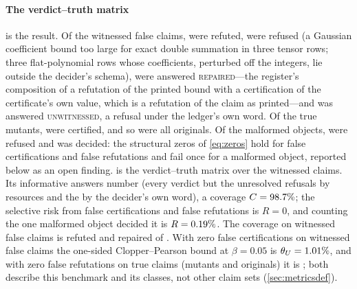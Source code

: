 \documentclass[preprint,11pt,a4paper]{elsarticle}
\theoremstyle{definition}
\begin{document}
\paragraph{The verdict--truth matrix}
 is the result. Of the \MtSaFalseWitnessed{} witnessed false claims, \MtSaFalseRefuted{} were refuted, \MtSaRefusalsOnFalse{} were refused (a Gaussian coefficient bound too large for exact double summation in three tensor rows; three flat-polynomial rows whose coefficients, perturbed off the integers, lie outside the decider's schema), \MtSaRepaired{} were answered \textsc{repaired}---the register's composition of a refutation of the printed bound with a certification of the certificate's own value, which is a refutation of the claim as printed---and \MtSaUnwitnessed{} was answered \textsc{unwitnessed}, a refusal under the ledger's own word. Of the \MtSaTrue{} true mutants, \MtSaTrueCertified{} were certified, and so were all \MtSaMutObjects{} originals. Of the \MtSaMalformed{} malformed objects, \MtSaMalformedRefused{} were refused and \MtSaMalformedNotRefused{} was decided: the structural zeros of \cref{eq:zeros} hold for false certifications and false refutations and fail once for a malformed object, reported below as an open finding.  is the verdict--truth matrix over the \MtSaN{} witnessed claims. Its informative answers number \MtSaInformative{} (every verdict but the \MtSaRefusalsOnFalse{} unresolved refusals by resources and the \MtSaUnwitnessed{} by the decider's own word), a coverage $C=98.7\%$; the selective risk from false certifications and false refutations is $R=0$, and counting the one malformed object decided it is $R=0.19\%$. The coverage on witnessed false claims is \MtSaFalseRefuted{} refuted and \MtSaRepaired{} repaired of \MtSaFalseWitnessed. With zero false certifications on \MtSaFalseWitnessed{} witnessed false claims the one-sided Clopper--Pearson bound at $\beta=0.05$ is $\theta_U=1.01\%$, and with zero false refutations on \MtSaTrueDecided{} true claims (mutants and originals) it is \MtSaCpTrue; both describe this benchmark and its classes, not other claim sets (\cref{sec:metricsdef}).
\end{document}

